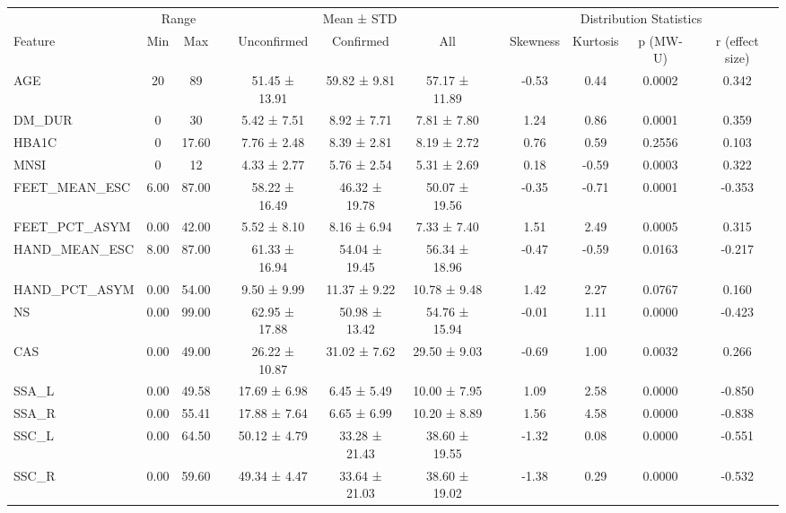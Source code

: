 \documentclass[pdflatex,sn-vancouver-num]{sn-jnl}
\let\cline\cmidrule %
\begin{document}
\begin{table}[t]
\centering
\footnotesize
\begin{tabular}{lccccccccccc}
\toprule
& \multicolumn{2}{c}{Range} &&  \multicolumn{3}{c}{Mean ± STD} && \multicolumn{4}{c}{Distribution Statistics} \\       
\cline{2-3} \cline{5-7}  \cline{9-12}
Feature & Min & Max  && Unconfirmed & Confirmed & All &&  Skewness & Kurtosis & p (MW-U) & r (effect size) \\
\midrule
AGE & 20 & 89 && 51.45 ± 13.91 & 59.82 ± 9.81 & 57.17 ± 11.89 && -0.53 & 0.44 & 0.0002 & 0.342 \\
DM\_DUR & 0 & 30 && 5.42 ± 7.51 & 8.92 ± 7.71 & 7.81 ± 7.80 && 1.24 & 0.86 & 0.0001 & 0.359 \\
HBA1C & 0 & 17.60 && 7.76 ± 2.48 & 8.39 ± 2.81 & 8.19 ± 2.72 && 0.76 & 0.59 & 0.2556 & 0.103 \\
\midrule
MNSI & 0 & 12 && 4.33 ± 2.77 & 5.76 ± 2.54 & 5.31 ± 2.69 && 0.18 & -0.59 & 0.0003 & 0.322 \\
\midrule
FEET\_MEAN\_ESC & 6.00 & 87.00 &  & 58.22 ± 16.49 & 46.32 ± 19.78 & 50.07 ± 19.56 &  & -0.35 & -0.71 & 0.0001 & -0.353 \\
FEET\_PCT\_ASYM & 0.00 & 42.00 &  & 5.52 ± 8.10 & 8.16 ± 6.94 & 7.33 ± 7.40 &  & 1.51 & 2.49 & 0.0005 & 0.315 \\
HAND\_MEAN\_ESC & 8.00 & 87.00 &  & 61.33 ± 16.94 & 54.04 ± 19.45 & 56.34 ± 18.96 &  & -0.47 & -0.59 & 0.0163 & -0.217 \\
HAND\_PCT\_ASYM & 0.00 & 54.00 &  & 9.50 ± 9.99 & 11.37 ± 9.22 & 10.78 ± 9.48 &  & 1.42 & 2.27 & 0.0767 & 0.160 \\
NS & 0.00 & 99.00 &  & 62.95 ± 17.88 & 50.98 ± 13.42 & 54.76 ± 15.94 &  & -0.01 & 1.11 & 0.0000 & -0.423 \\
CAS & 0.00 & 49.00 &  & 26.22 ± 10.87 & 31.02 ± 7.62 & 29.50 ± 9.03 &  & -0.69 & 1.00 & 0.0032 & 0.266 \\
\midrule
SSA\_L & 0.00 & 49.58 &  & 17.69 ± 6.98 & 6.45 ± 5.49 & 10.00 ± 7.95 &  & 1.09 & 2.58 & 0.0000 & -0.850 \\
SSA\_R & 0.00 & 55.41 &  & 17.88 ± 7.64 & 6.65 ± 6.99 & 10.20 ± 8.89 &  & 1.56 & 4.58 & 0.0000 & -0.838 \\
SSC\_L & 0.00 & 64.50 &  & 50.12 ± 4.79 & 33.28 ± 21.43 & 38.60 ± 19.55 &  & -1.32 & 0.08 & 0.0000 & -0.551 \\
SSC\_R & 0.00 & 59.60 &  & 49.34 ± 4.47 & 33.64 ± 21.03 & 38.60 ± 19.02 &  & -1.38 & 0.29 & 0.0000 & -0.532 \\

\end{tabular}
\end{table}
\end{document}
